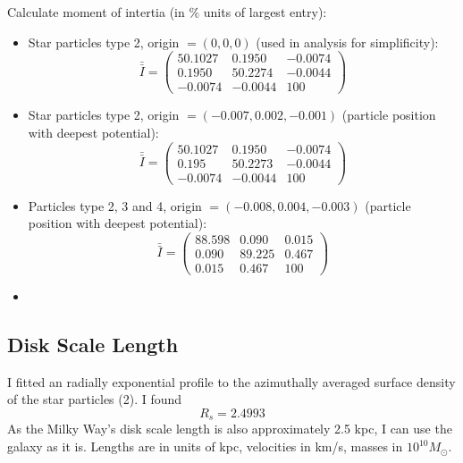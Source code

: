 Calculate moment of intertia (in \% units of largest entry):
\begin{itemize}
\item Star particles type 2, origin $= (0,0,0)$ (used in analysis for simplificity):
\begin{equation*}
\bar{\bar{I}} = \begin{pmatrix}
50.1027 &   0.1950 & -0.0074 \\
0.1950  &   50.2274 &  -0.0044 \\
-0.0074 &  -0.0044 &   100
\end{pmatrix}
\end{equation*}
\item Star particles type 2, origin $= (-0.007,0.002,-0.001)$ (particle position with deepest potential):
\begin{equation*}
\bar{\bar{I}} = \begin{pmatrix}
50.1027 &  0.1950 & -0.0074\\
 0.195 & 50.2273 & -0.0044\\
-0.0074 & -0.0044 & 100
\end{pmatrix}
\end{equation*}
\item Particles type 2, 3 and 4, origin $= (-0.008, 0.004, -0.003)$ (particle position with deepest potential):
\begin{equation*}
\bar{\bar{I}} = \begin{pmatrix}
88.598 &  0.090 & 0.015\\
 0.090 & 89.225 & 0.467\\
 0.015 &  0.467 & 100
\end{pmatrix}
\end{equation*}
\item {}
\end{itemize}

\subsection{Disk Scale Length}

I fitted an radially exponential profile to the azimuthally averaged surface density of the star particles (2). I found 
$$R_s = 2.4993$$
As the Milky Way's disk scale length is also approximately 2.5 kpc, I can use the galaxy as it is. Lengths are in units of kpc, velocities in km/s, masses in $10^{10} M_\odot$.